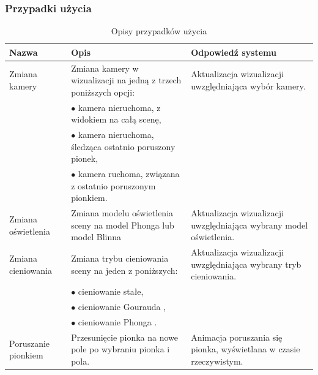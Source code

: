\documentclass[10pt,a4paper]{article}
\begin{document}
\subsubsection*{Przypadki użycia}

\begin{table}[H]
	\begin{tabularx}{\textwidth}{|l|X|X|}
		\hline
		\textbf{Nazwa} & \textbf{Opis} & \textbf{Odpowiedź systemu} \\
		\hline
		Zmiana kamery &
		Zmiana kamery w wizualizacji na jedną z trzech poniższych opcji:
		& Aktualizacja wizualizacji uwzględniająca wybór kamery.
		\\
		& $\bullet$ kamera nieruchoma, z widokiem na całą scenę, & \\
		& $\bullet$ kamera nieruchoma, śledząca ostatnio poruszony pionek, & \\
		& $\bullet$ kamera ruchoma, związana z ostatnio poruszonym pionkiem. & \\
		\hline
		Zmiana oświetlenia &
		Zmiana modelu oświetlenia sceny na model Phonga \cite{phong75} lub model Blinna \cite{blinn77} &
		Aktualizacja wizualizacji uwzględniająca wybrany model oświetlenia. \\
		\hline
		Zmiana cieniowania &
		Zmiana trybu cieniowania sceny na jeden z poniższych: &
		Aktualizacja wizualizacji uwzględniająca wybrany tryb cieniowania. \\
		& $\bullet$ cieniowanie stałe, & \\
		& $\bullet$ cieniowanie Gourauda \cite{gouraud71}, & \\
		& $\bullet$ cieniowanie Phonga \cite{phong75}. & \\
		\hline
		Poruszanie pionkiem &
		Przesunięcie pionka na nowe pole po wybraniu pionka i pola. &
		Animacja poruszania się pionka, wyświetlana w czasie rzeczywistym. \\
		\hline
	\end{tabularx}
	\caption{Opisy przypadków użycia}
\end{table}
\end{document}
